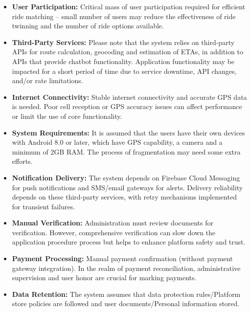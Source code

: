 \begin{itemize}
    \item \textbf{User Participation:} Critical mass of user participation required for efficient ride matching – small number of users may reduce the effectiveness of ride twinning and the number of ride options available.

    \item \textbf{Third-Party Services:} Please note that the system relies on third-party APIs for route calculation, geocoding and estimation of ETAs, in addition to APIs that provide chatbot functionality. Application functionality may be impacted for a short period of time due to service downtime, API changes, and/or rate limitations.

    \item \textbf{Internet Connectivity:} Stable internet connectivity and accurate GPS data is needed. Poor cell reception or GPS accuracy issues can affect performance or limit the use of core functionality.

    \item \textbf{System Requirements:} It is assumed that the users have their own devices with Android 8.0 or later, which have GPS capability, a camera and a minimum of 2GB RAM. The process of fragmentation may need some extra efforts.

    \item \textbf{Notification Delivery:} The system depends on Firebase Cloud Messaging for push notifications and SMS/email gateways for alerts. Delivery reliability depends on these third-party services, with retry mechanisms implemented for transient failures.

    \item \textbf{Manual Verification:} Administration must review documents for verification. However, comprehensive verification can slow down the application procedure process but helps to enhance platform safety and trust.

    \item \textbf{Payment Processing:} Manual payment confirmation (without payment gateway integration). In the realm of payment reconciliation, administrative supervision and user honor are crucial for marking payments.

    \item \textbf{Data Retention:} The system assumes that data protection rules/Platform store policies are followed and user documents/Personal information stored.
\end{itemize}

